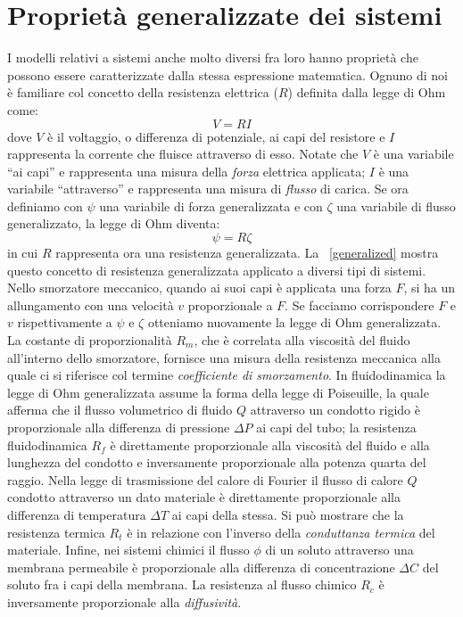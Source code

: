 \section{Proprietà generalizzate dei sistemi}

I modelli relativi a sistemi anche molto diversi fra loro hanno proprietà che possono essere caratterizzate dalla stessa espressione matematica. Ognuno di noi è familiare col concetto della resistenza elettrica ($R$) definita dalla legge di Ohm come: 
$$V = RI$$ 
dove $V$ è il voltaggio, o differenza di potenziale, ai capi del resistore e $I$ rappresenta la corrente che fluisce attraverso di esso. Notate che $V$ è una variabile ``ai capi'' e rappresenta una misura della \textit{forza} elettrica applicata; $I$ è una variabile ``attraverso'' e rappresenta una misura di \textit{flusso} di carica. Se ora definiamo con $\psi$ una variabile di forza generalizzata e con $\zeta$ una variabile di flusso generalizzato, la legge di Ohm diventa:
$$\psi = R \zeta $$
in cui $R$ rappresenta ora una resistenza generalizzata. La \figurename~\ref{generalized} mostra questo concetto di resistenza generalizzata applicato a diversi tipi di sistemi. Nello smorzatore meccanico, quando ai suoi capi è applicata una forza $F$, si ha un allungamento con una velocità $v$ proporzionale a $F$. Se facciamo corrispondere $F$ e $v$ rispettivamente a $\psi$ e $\zeta$ otteniamo nuovamente la legge di Ohm generalizzata. La costante di proporzionalità $R_m$, che è correlata alla viscosità del fluido all'interno dello smorzatore, fornisce una misura della resistenza meccanica alla quale ci si riferisce col termine \textit{coefficiente di smorzamento}. In fluidodinamica la legge di Ohm generalizzata assume la forma della legge di Poiseuille, la quale afferma che il flusso volumetrico di fluido $Q$ attraverso un condotto rigido è proporzionale alla differenza di pressione $\Delta P$ ai capi del tubo; la resistenza fluidodinamica $R_f$ è direttamente proporzionale alla viscosità del fluido e alla lunghezza del condotto e inversamente proporzionale alla potenza quarta del raggio. Nella legge di trasmissione del calore di Fourier il flusso di calore $Q$ condotto attraverso un dato materiale è direttamente proporzionale alla differenza di temperatura $\Delta T$ ai capi della stessa. Si può mostrare che la resistenza termica $R_t$ è in relazione con l'inverso della \textit{conduttanza termica} del materiale. Infine, nei sistemi chimici il flusso $\phi$ di un soluto attraverso una membrana permeabile è proporzionale alla differenza di concentrazione $\Delta C$ del soluto fra i capi della membrana. La resistenza al flusso chimico $R_c$ è inversamente proporzionale alla \textit{diffusività}.

